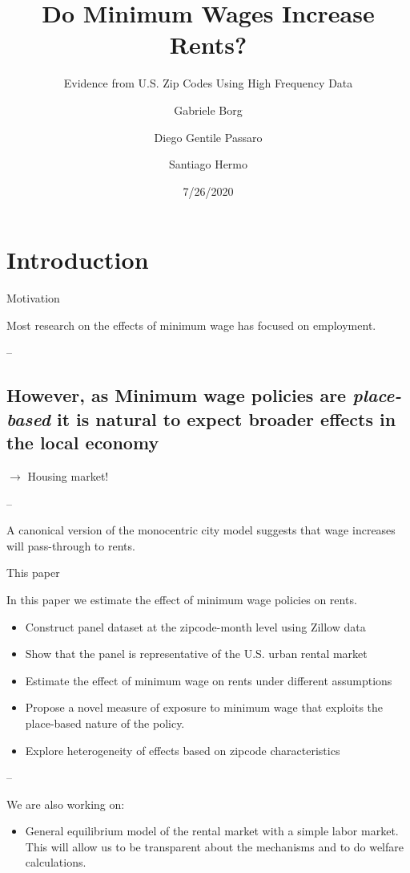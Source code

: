\documentclass[ignorenonframetext,aspectratio=169]{beamer}
\title{Do Minimum Wages Increase Rents?}
\subtitle{Evidence from U.S. Zip Codes Using High Frequency Data}
\author{Gabriele Borg \and Diego Gentile Passaro \and Santiago Hermo}
\date{7/26/2020}
\providecommand{\tightlist}{%
  \setlength{\itemsep}{0pt}\setlength{\parskip}{0pt}}
\begin{document}
\frame{\titlepage}

\hypertarget{introduction}{%
\section{Introduction}\label{introduction}}

\begin{frame}{Motivation}
\protect\hypertarget{motivation}{}

Most research on the effects of minimum wage has focused on employment.

--

\end{frame}

\hypertarget{however-as-minimum-wage-policies-are-place-based-it-is-natural-to-expect-broader-effects-in-the-local-economy}{%
\subsection{\texorpdfstring{However, as Minimum wage policies are
\emph{place-based} it is natural to expect broader effects in the local
economy}{However, as Minimum wage policies are place-based it is natural to expect broader effects in the local economy}}\label{however-as-minimum-wage-policies-are-place-based-it-is-natural-to-expect-broader-effects-in-the-local-economy}}

\(\to\) Housing market!

--

A canonical version of the monocentric city model suggests that wage
increases will pass-through to rents.

\begin{frame}{This paper}
\protect\hypertarget{this-paper}{}

In this paper we estimate the effect of minimum wage policies on rents.

\begin{itemize}
\tightlist
\item
  Construct panel dataset at the zipcode-month level using Zillow data
\item
  Show that the panel is representative of the U.S. urban rental market
\item
  Estimate the effect of minimum wage on rents under different
  assumptions
\item
  Propose a novel measure of exposure to minimum wage that exploits the
  place-based nature of the policy.
\item
  Explore heterogeneity of effects based on zipcode characteristics
\end{itemize}

--

We are also working on:

\begin{itemize}
\tightlist
\item
  General equilibrium model of the rental market with a simple labor
  market. This will allow us to be transparent about the mechanisms and
  to do welfare calculations.
\end{itemize}

\end{frame}
\end{document}
